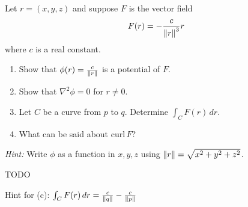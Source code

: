 \begin{exercise}
	Let $r = (x,y,z)$ and suppose $F$ is the vector field
	$$
		F(r) = - \frac{c}{\left\lVert r \right\rVert^3} r
	$$
	where $c$ is a real constant.
	\begin{enumerate}
		\item Show that $\phi(r) = \frac{c}{\left\lVert r \right\rVert}$ is a potential of $F$.

		\item Show that $\nabla^2 \phi = 0$ for $r \neq 0$.

		\item Let $C$ be a curve from $p$ to $q$. Determine $\int_C F(r) \, dr$.

		\item What can be said about $\mathrm{curl} \, F$?
	\end{enumerate}

	\emph{Hint:} Write $\phi$ as a function in $x, y, z$ using $\left\lVert r \right\rVert = \sqrt{x^2 + y^2 + z^2}$.
\end{exercise}

\begin{solution}
	TODO

  Hint for (c): $\int_C F(r) \, dr = \frac{c}{\left\lVert q \right\rVert} - \frac{c}{\left\lVert p \right\rVert}$
\end{solution}

